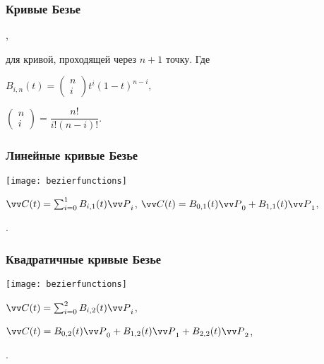\documentclass[10pt]{beamer}
\begin{document}
\begin{frame}\frametitle{Кривые Безье}
	
	{
		
		
	}{
		,
		
		для кривой, проходящей через $n+1$ точку. Где
		
		$B_{i,n}(t) = 
		\begin{pmatrix}
			n\\
			i
		\end{pmatrix}
		t^i(1-t)^{n-i},$
		
		$\begin{pmatrix}
			n\\
			i
		\end{pmatrix}
		=
		\dfrac{n!}{i!(n-i)!}.$
	}
	
	
\end{frame}

\begin{frame}\frametitle{Линейные кривые Безье}
	
	{
	}{
		\begin{center}
			\texttt{[image: bezierfunctions]}
		\end{center}
		$\VV C(t)=\sum_{i=0}^1B_{i,1}(t)\VV P_i$,
		$\VV C(t) = B_{0,1}(t) \VV P_0+B_{1,1}(t) \VV P_1$,
		
		.
	}
	
\end{frame}

\begin{frame}\frametitle{Квадратичные кривые Безье}

	{
	}{
		\begin{center}
			\texttt{[image: bezierfunctions]}
		\end{center}
		
		$\VV C(t)=\sum_{i=0}^2B_{i,2}(t)\VV P_i$,
		
		$\VV C(t) = B_{0,2}(t) \VV P_0+B_{1,2}(t) \VV P_1+B_{2,2}(t) \VV P_2$,
		
		.
	}	
	
\end{frame}
\end{document}
